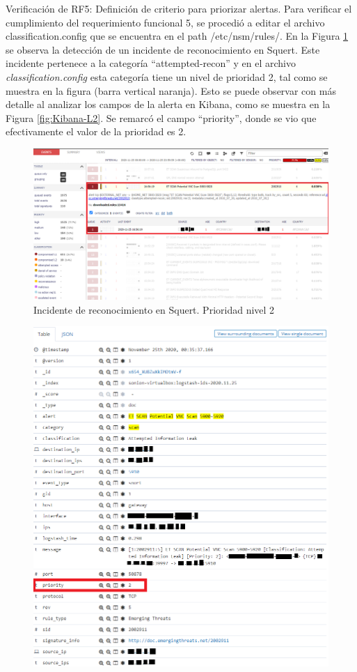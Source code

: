 \begin{section}{Verificación de RF5: Definición de criterio para priorizar alertas.}
    Para verificar el cumplimiento del requerimiento funcional 5, se procedió a editar el archivo  classification.config que se encuentra en el path /etc/nsm/rules/. En la Figura \ref{fig:squert-L2} se observa la detección de un incidente de reconocimiento en Squert. Este incidente pertenece a la categoría “attempted-recon” y en el archivo \textit{classification.config} esta categoría tiene un nivel de prioridad 2, tal como se muestra en la figura (barra vertical naranja). Esto se puede observar con más detalle al analizar los campos de la alerta en Kibana, como se muestra en la Figura \ref{fig:Kibana-L2}. Se remarcó el campo “priority”, donde se vio que efectivamente el valor de la prioridad es 2.
    \begin{figure}[H]
    \centering
    \includegraphics[width=1\textwidth]{./iteracion_3_imagenes/squert_ataque_vnc_L2-EDITADO.png}
    \caption{Incidente de reconocimiento en Squert. Prioridad nivel 2}
    \label{fig:squert-L2}
    \end{figure}
    \begin{figure}[H]
    \centering
    \includegraphics[width=1\textwidth]{./iteracion_3_imagenes/kibana_ataques_L2_1EDITADO.png}

\end{figure}
\end{section}
